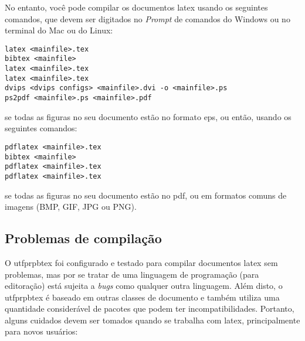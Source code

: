 No entanto, você pode compilar os documentos \gls{latex} usando os seguintes comandos, que devem ser digitados no \textit{Prompt} de comandos do Windows ou no terminal do Mac ou do Linux:

\begin{SingleSpacing}%
\begin{verbatim}
latex <mainfile>.tex
bibtex <mainfile>
latex <mainfile>.tex
latex <mainfile>.tex
dvips <dvips configs> <mainfile>.dvi -o <mainfile>.ps
ps2pdf <mainfile>.ps <mainfile>.pdf
\end{verbatim}
\end{SingleSpacing}

\noindent se todas as figuras no seu documento estão no formato \gls{eps}, ou então, usando os seguintes comandos:

\begin{SingleSpacing}%
\begin{verbatim}
pdflatex <mainfile>.tex
bibtex <mainfile>
pdflatex <mainfile>.tex
pdflatex <mainfile>.tex
\end{verbatim}
\end{SingleSpacing}

\noindent se todas as figuras no seu documento estão no \gls{pdf}, ou em formatos comuns de imagens (BMP, GIF, JPG ou PNG).

\subsection{Problemas de compilação}\label{sec:problemas}

O \gls{utfprpbtex} foi configurado e testado para compilar documentos \gls{latex} sem problemas, mas por se tratar de uma linguagem de programação (para editoração) está sujeita a \textit{bugs} como qualquer outra linguagem. Além disto, o \gls{utfprpbtex} é baseado em outras classes de documento e também utiliza uma quantidade considerável de pacotes que podem ter incompatibilidades. Portanto, alguns cuidados devem ser tomados quando se trabalha com \gls{latex}, principalmente para novos usuários:


